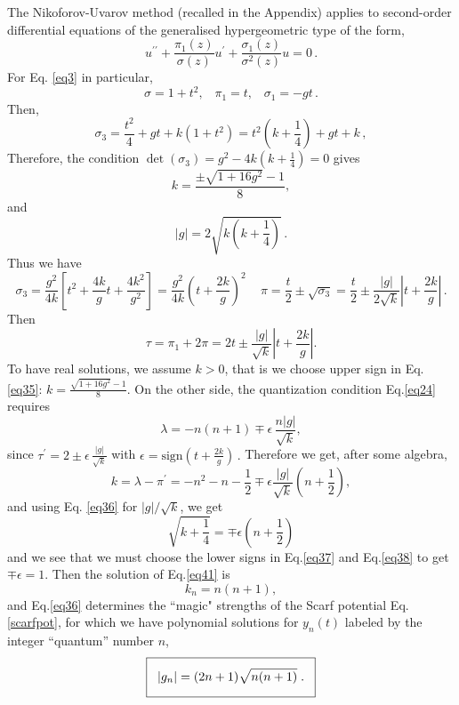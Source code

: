\documentclass[preprint,showpacs,preprintnumbers,amsmath,amssymb,nofootinbib]{revtex4}
\newcommand{\sign}{\mathrm{sign}}
\newcommand{\medbox}[1]{\fbox{%
\rule[-10pt]{0pt}{25pt}$\;\;\displaystyle{#1}\;\;$}%
}
\begin{document}
The Nikoforov-Uvarov method (recalled in the Appendix) applies to second-order differential equations of the generalised hypergeometric type of the form,
\begin{equation}
u^{\prime\prime}+\frac{\pi_1(z)}{\sigma(z)}u^\prime+\frac{\sigma_1(z)}{\sigma^2(z)}u=0\,.
\label{eq4} 
\end{equation}
For Eq. \eqref{eq3} in particular,
\begin{equation}
\sigma=1+t^2,\;\;\;\pi_1=t,\;\;\;\sigma_1=-gt\,.
\label{eq32}
\end{equation}
Then, 
\begin{equation}
\sigma_3=\frac{t^2}{4}+gt+k(1+t^2)=t^2\left(k+\frac{1}{4}\right)+gt+k\,,
\label{eq33}
\end{equation}
Therefore, the condition $\det(\sigma_3)
=g^2-4k\left(k+\frac{1}{4}\right)=0$ gives
\begin{equation}
k=\frac{\pm\sqrt{1+16g^2}-1}{8},
\label{eq35}
\end{equation}
and
\begin{equation}
|g|=2\sqrt{k\left(k+\frac{1}{4}\right)}\,.
\label{eq36}
\end{equation}
Thus we have
\begin{equation}
\sigma_3=\frac{g^2}{4k}\left [t^2+\frac{4k}{g}t+\frac{4k^2}{g^2}\right]=\frac{g^2}{4k}\left(t+\frac{2k}{g}\right)^2\,
\quad
\pi=\frac{t}{2}\pm \sqrt{\sigma_3}= \frac{t}{2}\pm\frac{|g|}{2\sqrt{k}}\left |t+\frac{2k}{g}\right|\,. 
\label{eq37}
\end{equation}
Then
\begin{equation}
\tau=\pi_1+2\pi=2t\pm \frac{|g|}{\sqrt{k}}\left |t+\frac{2k}{g}\right|.
\label{eq38}
\end{equation}
To have real solutions, we assume $k>0$, that is we choose upper sign in Eq.\eqref{eq35}:
$ 
k=\frac{\sqrt{1+16g^2}-1}{8}.   
$ 
On the other side, the quantization condition Eq.\eqref{eq24} requires
\begin{equation}
\lambda= -n(n+1)\mp\epsilon\,\frac{n|g|}{\sqrt{k}},
\label{eq40}
\end{equation}
since
$\tau^\prime=2\pm\epsilon\,\frac{|g|}{\sqrt{k}}$ with  
$\epsilon=\sign\left(t+\frac{2k}{g}\right)\,.$
Therefore we get, after some algebra,
$$
k=\lambda-\pi^\prime=-n^2-n-\frac{1}{2}\mp\epsilon\frac{|g|}{\sqrt{k}}\left(n+\frac{1}{2}\right ),
$$
and using Eq. \eqref{eq36} for $|g|/\sqrt{k}$, we get 
\begin{equation}
\sqrt{k+\frac{1}{4}}=\mp\epsilon\left(n+\frac{1}{2}\right)
\label{eq41}
\end{equation}
and we see that we must choose the lower signs in Eq.\eqref{eq37} and Eq.\eqref{eq38} to get $\mp\epsilon=1$. Then the solution of Eq.\eqref{eq41} is
\begin{equation}
k_n=n(n+1),
\label{eq42}
\end{equation}
and Eq.\eqref{eq36} determines the ``magic" strengths of the  Scarf potential Eq.\eqref{scarfpot}, for which we have polynomial solutions for $y_n(t)$ labeled by the integer ``quantum'' number $n$,
\begin{equation}
\medbox{
|g_n|=(2n+1)\sqrt{n(n+1)}\;.
}
\label{eq43}
\end{equation}
\end{document}
